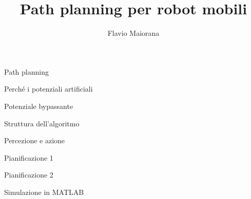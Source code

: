 \documentclass[12pt,handout]{beamer}
\title{Path planning per robot mobili}
\author{Flavio Maiorana}
\begin{document}
\frame{\titlepage}

\begin{frame}{Path planning}
\end{frame}

\begin{frame}{Perché i potenziali artificiali}
\end{frame}

\begin{frame}{Potenziale bypassante}
\end{frame}

\begin{frame}{Struttura dell'algoritmo}
\end{frame}

\begin{frame}{Percezione e azione}
\end{frame}

\begin{frame}{Pianificazione 1}
\end{frame}

\begin{frame}{Pianificazione 2}
\end{frame}

\begin{frame}{Simulazione in MATLAB}
\graphicspath{ {./figure/simulazione1} }
\end{frame}
\end{document}
